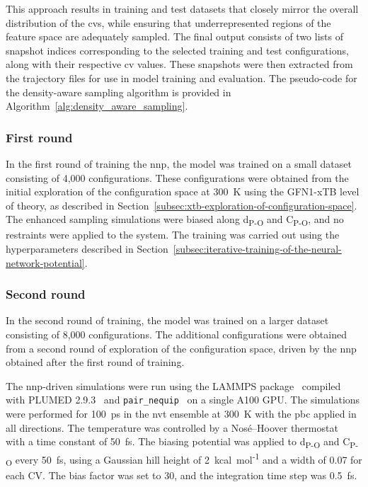 This approach results in training and test datasets that closely mirror the overall distribution of the \acp{cv}, while ensuring that underrepresented regions of the feature space are adequately sampled. The final output consists of two lists of snapshot indices corresponding to the selected training and test configurations, along with their respective \ac{cv} values. These snapshots were then extracted from the trajectory files for use in model training and evaluation. The pseudo-code for the density-aware sampling algorithm is provided in Algorithm~\ref{alg:density_aware_sampling}.



\subsubsection{First round}
In the first round of training the \ac{nnp}, the model was trained on a small dataset consisting of 4,000 configurations. These configurations were obtained from the initial exploration of the configuration space at 300~K using the GFN1-xTB level of theory, as described in Section~\ref{subsec:xtb-exploration-of-configuration-space}. The enhanced sampling simulations were biased along d\textsubscript{P-O} and C\textsubscript{P-O}, and no restraints were applied to the system. The training was carried out using the hyperparameters described in Section~\ref{subsec:iterative-training-of-the-neural-network-potential}.



\subsubsection{Second round}
In the second round of training, the model was trained on a larger dataset consisting of 8,000 configurations. The additional configurations were obtained from a second round of exploration of the configuration space, driven by the \ac{nnp} obtained after the first round of training.

The \ac{nnp}-driven simulations were run using the LAMMPS package~\citep{thompsonLAMMPSFlexibleSimulation2022} compiled with PLUMED 2.9.3~\citep{tribelloPLUMED2New2014} and \texttt{pair\_nequip}~\citep{MirgroupPair_nequip} on a single A100 GPU. The simulations were performed for 100~ps in the \ac{nvt} ensemble at 300~K with the \ac{pbc} applied in all directions. The temperature was controlled by a Nos\'e--Hoover thermostat~\citep{noseUnifiedFormulationConstant1984, hooverCanonicalDynamicsEquilibrium1985} with a time constant of 50~fs. The biasing potential was applied to d\textsubscript{P-O} and C\textsubscript{P-O} every 50~fs, using a Gaussian hill height of 2~kcal~mol\textsuperscript{-1} and a width of 0.07 for each CV. The bias factor was set to 30, and the integration time step was 0.5~fs.

